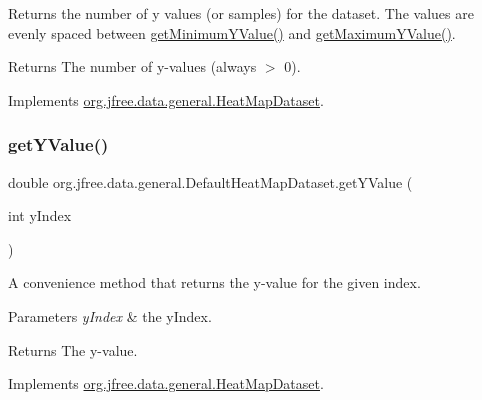 Returns the number of y values (or samples) for the dataset. The values are evenly spaced between \mbox{\hyperlink{classorg_1_1jfree_1_1data_1_1general_1_1_default_heat_map_dataset_a668dc2df7c2f9e52f76d076fd1b89cd0}{get\+Minimum\+Y\+Value()}} and \mbox{\hyperlink{classorg_1_1jfree_1_1data_1_1general_1_1_default_heat_map_dataset_a5d18e184f6950c93da573d964e692d5c}{get\+Maximum\+Y\+Value()}}.

\begin{DoxyReturn}{Returns}
The number of y-\/values (always $>$ 0). 
\end{DoxyReturn}


Implements \mbox{\hyperlink{interfaceorg_1_1jfree_1_1data_1_1general_1_1_heat_map_dataset_adc230b763b1adc1b0af0210cc68760c6}{org.\+jfree.\+data.\+general.\+Heat\+Map\+Dataset}}.

\mbox{\label{classorg_1_1jfree_1_1data_1_1general_1_1_default_heat_map_dataset_a8fcca5de20effdeea0e7decf94425d6d}} 
\subsubsection{\texorpdfstring{get\+Y\+Value()}{getYValue()}}
{\footnotesize\ttfamily double org.\+jfree.\+data.\+general.\+Default\+Heat\+Map\+Dataset.\+get\+Y\+Value (\begin{DoxyParamCaption}\item[{int}]{y\+Index }\end{DoxyParamCaption})}

A convenience method that returns the y-\/value for the given index.


\begin{DoxyParams}{Parameters}
{\em y\+Index} & the y\+Index.\\
\hline
\end{DoxyParams}
\begin{DoxyReturn}{Returns}
The y-\/value. 
\end{DoxyReturn}


Implements \mbox{\hyperlink{interfaceorg_1_1jfree_1_1data_1_1general_1_1_heat_map_dataset_a688282ee25f73c73ac1b0686bfbbe88f}{org.\+jfree.\+data.\+general.\+Heat\+Map\+Dataset}}.

